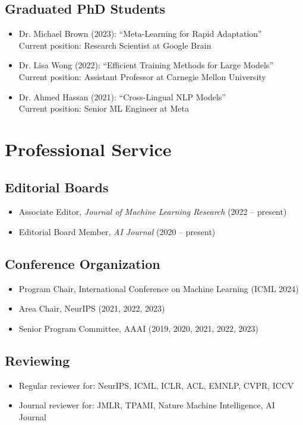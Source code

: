 \documentclass[11pt,letterpaper]{article}
\begin{document}
\subsection{Graduated PhD Students}
\begin{itemize}[leftmargin=*]
  \item Dr. Michael Brown (2023): ``Meta-Learning for Rapid Adaptation''\\
  Current position: Research Scientist at Google Brain

  \item Dr. Lisa Wong (2022): ``Efficient Training Methods for Large Models''\\
  Current position: Assistant Professor at Carnegie Mellon University

  \item Dr. Ahmed Hassan (2021): ``Cross-Lingual NLP Models''\\
  Current position: Senior ML Engineer at Meta
\end{itemize}

\section{Professional Service}

\subsection{Editorial Boards}
\begin{itemize}[leftmargin=*]
  \item Associate Editor, \textit{Journal of Machine Learning Research} (2022 -- present)
  \item Editorial Board Member, \textit{AI Journal} (2020 -- present)
\end{itemize}

\subsection{Conference Organization}
\begin{itemize}[leftmargin=*]
  \item Program Chair, International Conference on Machine Learning (ICML 2024)
  \item Area Chair, NeurIPS (2021, 2022, 2023)
  \item Senior Program Committee, AAAI (2019, 2020, 2021, 2022, 2023)
\end{itemize}

\subsection{Reviewing}
\begin{itemize}[leftmargin=*]
  \item Regular reviewer for: NeurIPS, ICML, ICLR, ACL, EMNLP, CVPR, ICCV
  \item Journal reviewer for: JMLR, TPAMI, Nature Machine Intelligence, AI Journal
\end{itemize}
\end{document}
